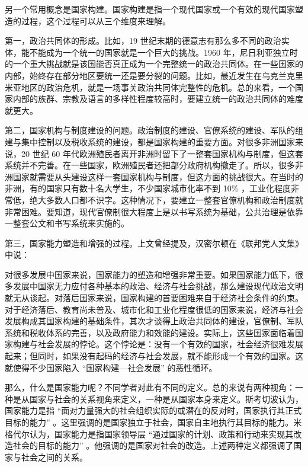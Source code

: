 另一个常用概念是国家构建。国家构建是指一个现代国家或一个有效的现代国家塑造的过程，这个过程可以从三个维度来理解。

第一，政治共同体的形成。比如，19 世纪末期的德意志有那么多不同的政治实体，能不能成为一个统一的国家就是一个巨大的挑战。1960 年，尼日利亚独立时的一个重大挑战就是该国能否真正成为一个完整统一的政治共同体。在一些国家的内部，始终存在部分地区要统一还是要分裂的问题。比如，最近发生在乌克兰克里米亚地区的政治危机，就是一场事关政治共同体完整性的危机。总的来看，一个国家内部的族群、宗教及语言的多样性程度较高时，要建立统一的政治共同体的难度就更大。

第二，国家机构与制度建设的问题。政治制度的建设、官僚系统的建设、军队的组建与集中控制以及税收系统的建设，都是国家构建的重要方面。对很多非洲国家来说，20 世纪 60 年代欧洲殖民者离开非洲时留下了一整套国家机构与制度，但这套系统并不完善。在一些国家，欧洲殖民者还把部分政府机构撤走了。所以，很多非洲国家就需要从头建设这样一套国家机构与制度，但这方面的挑战很大。在当时的非洲，有的国家只有数十名大学生，不少国家城市化率不到 10\% ，工业化程度非常低，绝大多数人口都不识字。这种情况下，要建立一整套官僚机构和政治制度就非常困难。要知道，现代官僚制很大程度上是以书写系统为基础，公共治理是依靠一整套公文和书写系统来实施的。

第三，国家能力塑造和增强的过程。上文曾经提及，汉密尔顿在《联邦党人文集》中说：


对很多发展中国家来说，国家能力的塑造和增强非常重要。如果国家能力低下，很多发展中国家无力应付各种基本的政治、经济与社会挑战，那么建设现代政治文明就无从谈起。对落后国家来说，国家构建的首要困难来自于经济社会条件的约束。对于经济落后、教育尚未普及、城市化和工业化程度很低的国家来说，经济与社会发展构成其国家构建的基础条件，其次才谈得上政治共同体的建设，官僚制、军队系统和税收体系的完善，以及政府能力和效能的建设。实际上，这些国家面临着国家构建与社会发展的悖论。这个悖论是：没有一个有效的国家，社会经济很难发展起来；但同时，如果没有起码的经济与社会发展，就不能形成一个有效的国家。这就使得不少国家陷入 “国家构建—社会发展” 的恶性循环。

那么，什么是国家能力呢？不同学者对此有不同的定义。总的来说有两种视角：一种是从国家与社会的关系视角来定义，一种是从国家本身来定义。斯考切波认为，国家能力是指 “面对力量强大的社会组织实际的或潜在的反对时，国家执行其正式目标的能力” 。这里强调的是国家独立于社会，国家自主地执行其目标的能力。米格代尔认为，国家能力是指国家领导层 “通过国家的计划、政策和行动来实现其改造社会的目标的能力” 。他强调的是国家对社会的改造。上述两种定义都强调了国家与社会之间的关系。

